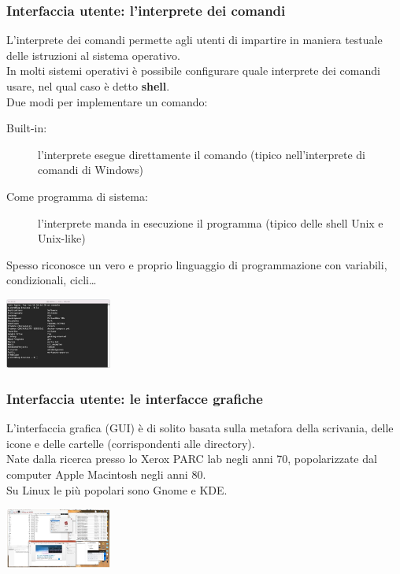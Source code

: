\begin{description}
\subsubsection{Interfaccia utente: l'interprete dei comandi}
L'interprete dei comandi permette agli utenti di impartire in maniera testuale delle istruzioni al sistema operativo.\\
In molti sistemi operativi è possibile configurare quale interprete dei comandi usare, nel qual caso è detto \textbf{shell}.\\
Due modi per implementare un comando:
\begin{description}
    \item[Built-in:] l'interprete esegue direttamente il comando (tipico nell'interprete di comandi di Windows)
    \item[Come programma di sistema:] l'interprete manda in esecuzione il programma (tipico delle shell Unix e Unix-like)
\end{description}
Spesso riconosce un vero e proprio linguaggio di programmazione con variabili, condizionali, cicli\dots
\begin{center}
    \includegraphics[width=35mm]{images/SO/SO_InterfacciaUtente_InterpreteComandi.jpg}
\end{center}

\subsubsection{Interfaccia utente: le interfacce grafiche}
L'interfaccia grafica (GUI) è di solito basata sulla metafora della scrivania, delle icone e delle cartelle (corrispondenti alle directory).\\
Nate dalla ricerca presso lo Xerox PARC lab negli anni 70, popolarizzate dal computer Apple Macintosh negli anni 80.\\
Su Linux le più popolari sono Gnome e KDE.
\begin{center}
    \includegraphics[width=35mm]{images/SO/SO_InterfacciaUtente_InterfacceGrafiche.jpg}
\end{center}


\end{description}
